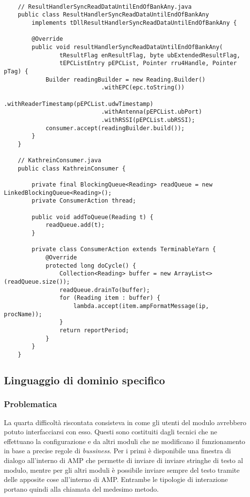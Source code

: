 \label{HandlerReading}
\begin{lstlisting}
    
    // ResultHandlerSyncReadDataUntilEndOfBankAny.java
    public class ResultHandlerSyncReadDataUntilEndOfBankAny
        implements tDllResultHandlerSyncReadDataUntilEndOfBankAny {

        @Override
        public void resultHandlerSyncReadDataUntilEndOfBankAny(
                tResultFlag enResultFlag, byte ubExtendedResultFlag,
                tEPCListEntry pEPCList, Pointer rru4Handle, Pointer pTag) {
            Builder readingBuilder = new Reading.Builder()
				    	    .withEPC(epc.toString())
					        .withReaderTimestamp(pEPCList.udwTimestamp)
					        .withAntenna(pEPCList.ubPort)
					        .withRSSI(pEPCList.ubRSSI);
            consumer.accept(readingBuilder.build());
        }
    }
    
    // KathreinConsumer.java
    public class KathreinConsumer {

        private final BlockingQueue<Reading> readQueue = new LinkedBlockingQueue<Reading>();
        private ConsumerAction thread;
        
        public void addToQueue(Reading t) {
		    readQueue.add(t);
	    }

        private class ConsumerAction extends TerminableYarn {
		    @Override
		    protected long doCycle() {
			    Collection<Reading> buffer = new ArrayList<>(readQueue.size());
			    readQueue.drainTo(buffer);
			    for (Reading item : buffer) {
				    lambda.accept(item.ampFormatMessage(ip, procName));
			    }
			    return reportPeriod;
		    }
	    }
    }
\end{lstlisting}

\subsection{Linguaggio di dominio specifico}
\label{sub-sec:DLS}
\subsubsection*{Problematica}
La quarta difficoltà riscontata consisteva in come gli utenti del modulo avrebbero potuto interfacciarsi con esso.
Questi sono costituiti dagli tecnici che ne effettuano la configurazione e da altri moduli che ne modificano il funzionamento
in base a precise regole di \emph{bussiness}. Per i primi è disponibile una finestra di dialogo all'interno di AMP che permette
di inviare di inviare stringhe di testo al modulo, mentre per gli altri moduli è possibile inviare sempre del testo
tramite delle apposite cose all'interno di AMP. Entrambe le tipologie di interazione portano quindi alla chiamata del medesimo metodo.

